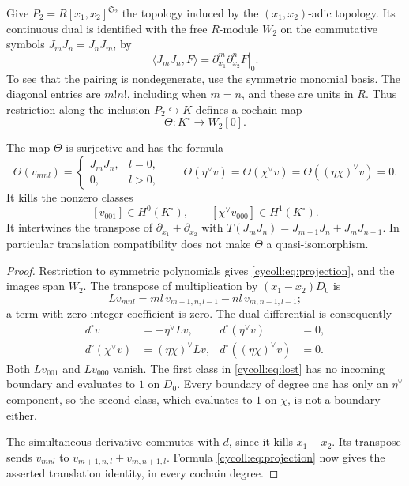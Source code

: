 Give $P_2=R[x_1,x_2]^{\mathfrak S_2}$ the topology induced by
the $(x_1,x_2)$-adic topology. Its continuous dual is
identified with the free $R$-module $W_2$ on the commutative
symbols $J_mJ_n=J_nJ_m$, by
\[
 \langle J_mJ_n,F\rangle
   =\left.\partial_{x_1}^m\partial_{x_2}^nF\right|_0.
\]
To see that the pairing is nondegenerate, use the symmetric
monomial basis. The diagonal entries are $m!n!$, including when
$m=n$, and these are units in $R$. Thus restriction along the
inclusion $P_2\hookrightarrow K$ defines a cochain map
\[
 \Theta:K^\circ\longrightarrow W_2[0].
\]

\begin{proposition}\label{cycoll:prop:lost-classes}
The map $\Theta$ is surjective and has the formula
\begin{equation}\label{cycoll:eq:projection}
 \Theta(v_{mnl})=
 \begin{cases}J_mJ_n,&l=0,\\0,&l>0,\end{cases}
 \qquad
 \Theta(\eta^\vee v)=\Theta(\chi^\vee v)
       =\Theta((\eta\chi)^\vee v)=0.
\end{equation}
It kills the nonzero classes
\begin{equation}\label{cycoll:eq:lost}
 [v_{001}]\in H^0(K^\circ),\qquad
 [\chi^\vee v_{000}]\in H^1(K^\circ).
\end{equation}
It intertwines the transpose of $\partial_{x_1}+\partial_{x_2}$
with $T(J_mJ_n)=J_{m+1}J_n+J_mJ_{n+1}$. In particular translation
compatibility does not make $\Theta$ a quasi-isomorphism.
\end{proposition}
\begin{proof}
Restriction to symmetric polynomials gives
\eqref{cycoll:eq:projection}, and the images span $W_2$.
The transpose of multiplication by $(x_1-x_2)D_0$ is
\[
 L v_{mnl}=ml\,v_{m-1,n,l-1}-nl\,v_{m,n-1,l-1};
\]
a term with zero integer coefficient is zero. The dual
differential is consequently
\begin{align*}
 d^\circ v&=-\eta^\vee Lv,&
 d^\circ(\eta^\vee v)&=0,\\
 d^\circ(\chi^\vee v)&=(\eta\chi)^\vee Lv,&
 d^\circ((\eta\chi)^\vee v)&=0.
\end{align*}
Both $Lv_{001}$ and $Lv_{000}$ vanish. The first class in
\eqref{cycoll:eq:lost} has no incoming boundary and evaluates to
$1$ on $D_0$. Every boundary of degree one has only an
$\eta^\vee$ component, so the second class, which evaluates to
$1$ on $\chi$, is not a boundary either.

The simultaneous derivative commutes with $d$, since it kills
$x_1-x_2$. Its transpose sends $v_{mnl}$ to
$v_{m+1,n,l}+v_{m,n+1,l}$. Formula
\eqref{cycoll:eq:projection} now gives the asserted translation
identity, in every cochain degree.
\end{proof}

